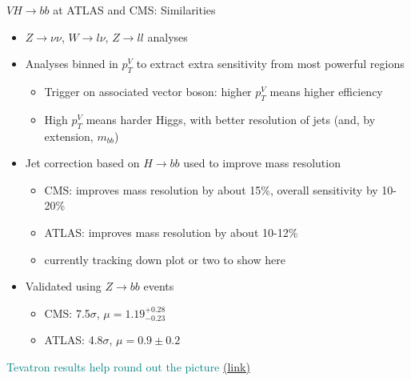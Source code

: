 \documentclass{beamer}
\begin{document}
\begin{frame}{$VH\rightarrow bb$ at ATLAS and CMS: Similarities}
	\begin{itemize} \scriptsize
		\item $Z\rightarrow \nu\nu$, $W\rightarrow l\nu$, $Z\rightarrow ll$ analyses 
		\item Analyses binned in $p^V_T$ to extract extra sensitivity from most powerful regions
			\begin{itemize} \scriptsize
				\item Trigger on associated vector boson: higher $p_T^V$ means higher efficiency
				\item High $p_T^V$ means harder Higgs, with better resolution of jets (and, by extension, $m_{bb}$)
			\end{itemize}
		\item Jet correction based on $H\rightarrow bb$ used to improve mass resolution
			\begin{itemize} \scriptsize
				\item CMS: improves mass resolution by about 15\%, overall sensitivity by 10-20\%
				\item ATLAS: improves mass resolution by about 10-12\%
				\item \textcolor{BrickRed}{currently tracking down plot or two to show here}
			\end{itemize}
		\item Validated using $Z\rightarrow bb$ events
			\begin{itemize} \scriptsize
				\item CMS: 7.5$\sigma$, $\mu=1.19^{+0.28}_{-0.23}$
				\item ATLAS: 4.8$\sigma$, $\mu=0.9\pm0.2$
			\end{itemize}
	\end{itemize}
	\scriptsize\textcolor{Teal}{Tevatron results help round out the picture} \href{http://arxiv.org/abs/1305.1530}{(link)}
\end{frame}
\end{document}
